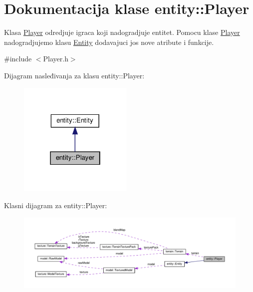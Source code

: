 \hypertarget{classentity_1_1Player}{}\section{Dokumentacija klase entity\+:\+:Player}
\label{classentity_1_1Player}


Klasa \hyperlink{classentity_1_1Player}{Player} odredjuje igraca koji nadogradjuje entitet. Pomocu klase \hyperlink{classentity_1_1Player}{Player} nadogradjujemo klasu \hyperlink{classentity_1_1Entity}{Entity} dodavajuci jos nove atribute i funkcije.  




{\ttfamily \#include $<$Player.\+h$>$}



Dijagram nasleđivanja za klasu entity\+:\+:Player\+:\nopagebreak
\begin{figure}[H]
\begin{center}
\leavevmode
\includegraphics[width=154pt]{classentity_1_1Player__inherit__graph}
\end{center}
\end{figure}


Klasni dijagram za entity\+:\+:Player\+:\nopagebreak
\begin{figure}[H]
\begin{center}
\leavevmode
\includegraphics[width=350pt]{classentity_1_1Player__coll__graph}
\end{center}
\end{figure}
